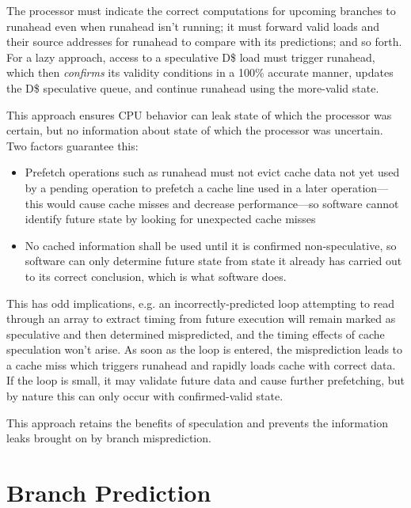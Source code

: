 The processor must indicate the correct computations for upcoming branches to runahead even when runahead isn't running; it must forward valid loads and their source addresses for runahead to compare with its predictions; and so forth.  For a lazy approach, access to a speculative D\$ load must trigger runahead, which then {\em confirms} its validity conditions in a 100\% accurate manner, updates the D\$ speculative queue, and continue runahead using the more-valid state.

This approach ensures CPU behavior can leak state of which the processor was certain, but no information about state of which the processor was uncertain.  Two factors guarantee this:

\begin{itemize}

    \item Prefetch operations such as runahead must not evict cache data not
        yet used by a pending operation to prefetch a cache line used in a
        later operation—this would cause cache misses and decrease
        performance—so software cannot identify future state by looking for
        unexpected cache misses

    \item No cached information shall be used until it is confirmed
        non-speculative, so software can only determine future state from state
        it already has carried out to its correct conclusion, which is what
        software does.

\end{itemize}

This has odd implications, e.g. an incorrectly-predicted loop attempting to
read through an array to extract timing from future execution will remain
marked as speculative and then determined mispredicted, and the timing effects
of cache speculation won't arise.  As soon as the loop is entered, the
misprediction leads to a cache miss which triggers runahead and rapidly loads
cache with correct data.  If the loop is small, it may validate future data and
cause further prefetching, but by nature this can only occur with
confirmed-valid state.

This approach retains the benefits of speculation and prevents the information
leaks brought on by branch misprediction.

\section{Branch Prediction}

